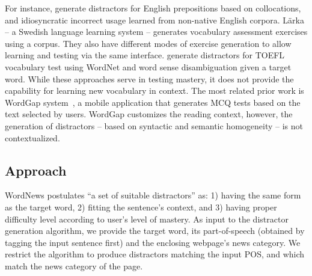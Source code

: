 For instance, \cite{lee2007} generate distractors for English prepositions
based on collocations, and idiosyncratic incorrect usage learned from non-native English corpora.   L{\"a}rka \cite{volodina2014} --
a Swedish language learning system -- generates vocabulary assessment
exercises using a corpus. They also have different modes of exercise
generation to allow learning and testing via the same interface.
\cite{susanti2015} generate distractors for TOEFL vocabulary test 
using WordNet and
word sense disambiguation given a target word.  
While these approaches serve
in testing mastery, it does not provide the capability for learning
new vocabulary in context.
The most related prior work is WordGap system~\cite{Knoop2013}, a mobile
application that generates MCQ tests based on the text selected by users. 
WordGap customizes the reading context, however, the generation of distractors -- based on syntactic and semantic homogeneity -- is not contextualized.
 




\subsection{Approach}
WordNews postulates ``a set of suitable distractors'' as: 1) having
the same form as the target word, 2) fitting the sentence's context,
and 3) having proper difficulty level according to user's level of
mastery.
As input to the distractor generation algorithm, we provide the target
word, its part-of-speech (obtained by tagging the input sentence
first) and the enclosing webpage's news category. We restrict the
algorithm to produce distractors matching the input POS, and which
match the news category of the page.


